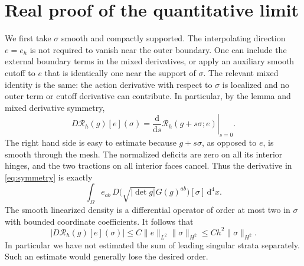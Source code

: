 \documentclass[11pt]{article}
\newcommand{\dd}{\mathrm d}
\newcommand{\Reg}{\mathcal R}
\begin{document}
\section{Real proof of the quantitative limit}

We first take \(\sigma\) smooth and compactly supported. The interpolating direction \(e=e_h\) is not required to vanish near the outer boundary. One can include the external boundary terms in the mixed derivatives, or apply an auxiliary smooth cutoff to \(e\) that is identically one near the support of \(\sigma\). The relevant mixed identity is the same: the action derivative with respect to \(\sigma\) is localized and no outer term or cutoff derivative can contribute. In particular, by the lemma and mixed derivative symmetry,
\begin{equation}
  D\Reg_h(g)[e](\sigma)
  =\left.\frac{\dd}{\dd s}\Reg_h(g+s\sigma;e)\right|_{s=0}.
  \label{eq:symmetry}
\end{equation}
The right hand side is easy to estimate because \(g+s\sigma\), as opposed to \(e\), is smooth through the mesh. The normalized deficits are zero on all its interior hinges, and the two tractions on all interior faces cancel. Thus the derivative in \eqref{eq:symmetry} is exactly
\[
 \int_\Omega e_{ab}\,D\bigl(\sqrt{|\det g|}G(g)^{ab}\bigr)[\sigma]\,\dd^4x .
\]
The smooth linearized density is a differential operator of order at most two in \(\sigma\) with bounded coordinate coefficients. It follows that
\begin{equation}
 |D\Reg_h(g)[e](\sigma)|
   \leq C\|e\|_{L^2}\|\sigma\|_{H^2}
   \leq C h^2\|\sigma\|_{H^2}.
 \label{eq:linear}
\end{equation}
In particular we have not estimated the sum of leading singular strata separately. Such an estimate would generally lose the desired order.
\end{document}
